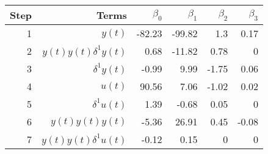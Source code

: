 \begin{tabular}{rrrrrr}
Step & Terms & $\beta_{0}$ & $\beta_{1}$ & $\beta_{2}$ & $\beta_{3}$ \\ 
\hline 
1 & $y(t)$ & -82.23 & -99.82 & 1.3 & 0.17 \\ 
2 & $y(t)y(t)\delta^1 y(t)$ & 0.68 & -11.82 & 0.78 & 0 \\ 
3 & $\delta^1 y(t)$ & -0.99 & 9.99 & -1.75 & 0.06 \\ 
4 & $u(t)$ & 90.56 & 7.06 & -1.02 & 0.02 \\ 
5 & $\delta^1 u(t)$ & 1.39 & -0.68 & 0.05 & 0 \\ 
6 & $y(t)y(t)y(t)$ & -5.36 & 26.91 & 0.45 & -0.08 \\ 
7 & $y(t)y(t)\delta^1 u(t)$ & -0.12 & 0.15 & 0 & 0 \\ 
\hline 
\end{tabular}